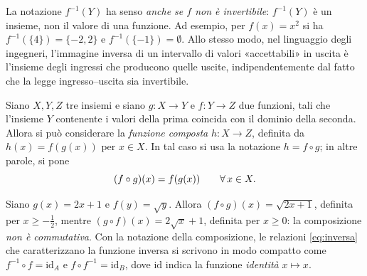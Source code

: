 \begin{osservazione}
La notazione $f^{-1}(Y)$ ha senso \emph{anche se $f$ non è invertibile}: $f^{-1}(Y)$ è
un insieme, non il valore di una funzione. Ad esempio, per $f(x)=x^{2}$ si ha
$f^{-1}(\{4\})=\{-2,2\}$ e $f^{-1}(\{-1\})=\emptyset$. Allo stesso modo, nel linguaggio
degli ingegneri, l'immagine inversa di un intervallo di valori «accettabili» in uscita è
l'insieme degli ingressi che producono quelle uscite, indipendentemente dal fatto che la
legge ingresso--uscita sia invertibile.
\end{osservazione}

\begin{definizione}
Siano $X,Y,Z$ tre insiemi e siano $g\colon X\to Y$ e $f\colon Y\to Z$ due funzioni, tali
che l'insieme $Y$ contenente i valori della prima coincida con il dominio della seconda.
Allora si può considerare la \emph{funzione composta} $h\colon X\to Z$, definita da
$h(x)=f(g(x))$ per $x\in X$. In tal caso si usa la notazione $h=f\circ g$; in altre
parole, si pone
\[
  (f\circ g)(x)=f(g(x)) \qquad\forall\, x\in X.
\]
\end{definizione}

\begin{marginfigure}
\centering
{}
\caption{La composizione $f\circ g$: prima si applica $g$, poi $f$. Si legge «$f$
composto $g$» e si calcola da destra verso sinistra.}
\end{marginfigure}

\begin{esempio}
Siano $g(x)=2x+1$ e $f(y)=\sqrt{y}$. Allora $(f\circ g)(x)=\sqrt{2x+1}$, definita per
$x\ge-\tfrac12$, mentre $(g\circ f)(x)=2\sqrt{x}+1$, definita per $x\ge0$: la
composizione \emph{non è commutativa}. Con la notazione della composizione, le
relazioni \eqref{eq:inversa} che caratterizzano la funzione inversa si scrivono in modo
compatto come $f^{-1}\circ f=\mathrm{id}_{A}$ e $f\circ f^{-1}=\mathrm{id}_{B}$, dove
$\mathrm{id}$ indica la funzione \emph{identità} $x\mapsto x$.
\end{esempio}

